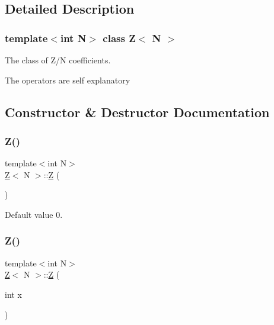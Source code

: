 \subsection{Detailed Description}
\subsubsection*{template$<$int N$>$\newline
class Z$<$ N $>$}

The class of Z/N coefficients. 

The operators are self explanatory 

\subsection{Constructor \& Destructor Documentation}
\mbox{\label{classZ_a21a5a03bc44e0a76607d1b89dc9e31cb}} 
\subsubsection{\texorpdfstring{Z()}{Z()}\hspace{0.1cm}{\footnotesize\ttfamily [1/4]}}
{\footnotesize\ttfamily template$<$int N$>$ \\
\hyperlink{classZ}{Z}$<$ N $>$\+::\hyperlink{classZ}{Z} (\begin{DoxyParamCaption}{ }\end{DoxyParamCaption})\hspace{0.3cm}{\ttfamily [inline]}}



Default value 0. 

\mbox{\label{classZ_aa6546d6135c97a5b8df9028068dfe0c1}} 
\subsubsection{\texorpdfstring{Z()}{Z()}\hspace{0.1cm}{\footnotesize\ttfamily [2/4]}}
{\footnotesize\ttfamily template$<$int N$>$ \\
\hyperlink{classZ}{Z}$<$ N $>$\+::\hyperlink{classZ}{Z} (\begin{DoxyParamCaption}\item[{int}]{x }\end{DoxyParamCaption})\hspace{0.3cm}{\ttfamily [inline]}}




